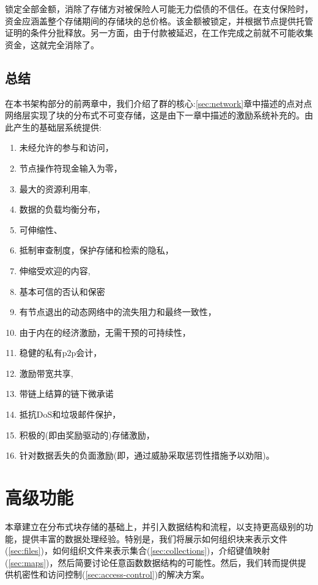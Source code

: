 锁定全部金额，消除了存储方对被保险人可能无力偿债的不信任。在支付保险时，资金应涵盖整个存储期间的存储块的总价格。该金额被锁定，并根据节点提供托管证明的条件分批释放。另一方面，由于付款被延迟，在工作完成之前就不可能收集资金，这就完全消除了。

\section{总结}


在本书架构部分的前两章中，我们介绍了群的核心:\ref{sec:network}章中描述的点对点网络层实现了块的分布式不可变存储，这是由下一章中描述的激励系统补充的。由此产生的基础层系统提供:

\begin{enumerate}
    \item 未经允许的参与和访问，
    \item 节点操作符现金输入为零，
    \item 最大的资源利用率, 
    \item 数据的负载均衡分布，
    \item 可伸缩性、 
    \item 抵制审查制度，保护存储和检索的隐私，
    \item 伸缩受欢迎的内容,
    \item 基本可信的否认和保密
    \item 有节点退出的动态网络中的流失阻力和最终一致性，
    \item 由于内在的经济激励，无需干预的可持续性，
    \item 稳健的私有p2p会计， 
    \item 激励带宽共享,
    \item 带链上结算的链下微承诺
    \item 抵抗DoS和垃圾邮件保护，
    \item 积极的(即由奖励驱动的)存储激励，
    \item 针对数据丢失的负面激励(即，通过威胁采取惩罚性措施予以劝阻)。
\end{enumerate}


\chapter{高级功能}\label{sec:high-level-functionality}


本章建立在分布式块存储的基础上，并引入数据结构和流程，以支持更高级别的功能，提供丰富的数据处理经验。特别是，我们将展示如何组织块来表示文件(\ref{sec:files})，如何组织文件来表示集合(\ref{sec:collections})，介绍键值映射(\ref{sec:maps})，然后简要讨论任意函数数据结构的可能性。然后，我们转而提供提供机密性和访问控制(\ref{sec:access-control})的解决方案。 

